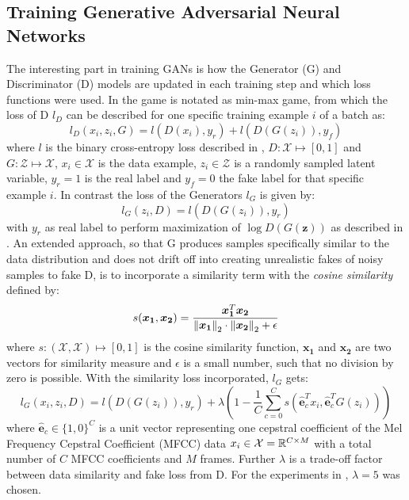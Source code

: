 \subsection{Training Generative Adversarial Neural Networks}
The interesting part in training GANs is how the Generator (G) and Discriminator (D) models are updated in each training step and which loss functions were used.
In  the game is notated as min-max game, from which the loss of D $l_D$ can be described for one specific training example $i$ of a batch as:
\begin{equation}
  l_D(x_i, z_i, G) = l(D(x_i), y_r) + l(D(G(z_i)), y_f)
\end{equation}
where $l$ is the binary cross-entropy loss described in , $D: \mathcal{X} \mapsto [0, 1]$ and $G: \mathcal{Z} \mapsto \mathcal{X}$, $x_i \in \mathcal{X}$ is the data example, $z_i \in \mathcal{Z}$ is a randomly sampled latent variable, $y_r = 1$ is the real label and $y_f = 0$ the fake label for that specific example $i$.
In contrast the loss of the Generators $l_G$ is given by:
\begin{equation}
  l_G(z_i, D) =  l(D(G(z_i)), y_r)
\end{equation}
with $y_r$ as real label to perform maximization of $\log D(G(\bm{z}))$ as described in .
An extended approach, so that G produces samples specifically similar to the data distribution and does not drift off into creating unrealistic fakes of noisy samples to fake D, is to incorporate a similarity term with the \emph{cosine similarity} defined by:
\begin{equation}
  s(\bm{x_1}, \bm{x_2}) = \frac{\bm{x_1}^T \bm{x_2}}{\norm{\bm{x_1}}_2 \cdot \norm{\bm{x_2}}_2 + \epsilon} 
\end{equation}
where $s : (\mathcal{X}, \mathcal{X}) \mapsto [0, 1]$ is the cosine similarity function, $\bm{x_1}$ and $\bm{x_2}$ are two vectors for similarity measure and $\epsilon$ is a small number, such that no division by zero is possible.
With the similarity loss incorporated, $l_G$ gets:
\begin{equation}
  l_G(x_i, z_i, D) =  l(D(G(z_i)), y_r) + \lambda \left(1 - \frac{1}{C} \sum_{c=0}^{C} s(\hat{\bm{e}}_c^T x_i , \hat{\bm{e}}_c^T G(z_i)) \right)
\end{equation}
where $\hat{\bm{e}}_c \in \{1, 0\}^C$ is a unit vector representing one cepstral coefficient of the Mel Frequency Cepstral Coefficient (MFCC) data $x_i \in \mathcal{X} = \mathbb{R}^{C \times M}$ with a total number of $C$ MFCC coefficients and $M$ frames.
Further $\lambda$ is a trade-off factor between data similarity and fake loss from D.
For the experiments in , $\lambda = 5$ was chosen.

